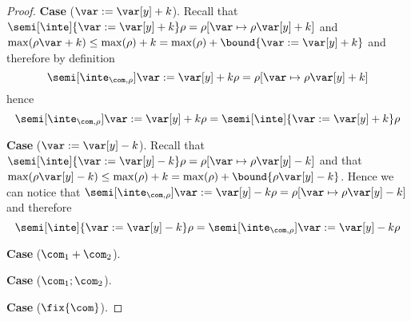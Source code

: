 \begin{proof}
  \medskip

  \noindent
  \textbf{Case} (\(\var := \var[y] + k\)).
  Recall that
  \({\semi[\inte]{\var := \var[y] + k}\rho} = {\rho[\var \mapsto
    \rho\var[y] + k]}\) and
  \({\max(\rho\var + k)} \leq {\max(\rho) + k} = {\max(\rho) +
    \bound{\var := \var[y] + k}}\)
  and therefore by definition
  \begin{equation*}
    \semi[\inte_{\com,\rho}]{\var := \var[y] + k}\rho = \rho[\var \mapsto \rho\var[y] + k]
  \end{equation*}
  hence
  \begin{equation*}
    \semi[\inte_{\com,\rho}]{\var := \var[y] + k}\rho = \semi[\inte]{\var := \var[y] + k}\rho
  \end{equation*}

  \medskip

  \noindent
  \textbf{Case} (\(\var := \var[y] - k\)).
  Recall that
  \({\semi[\inte]{\var := \var[y] - k}\rho} = {\rho[\var \mapsto
    \rho\var[y] - k]}\) and that
  \({\max(\rho\var[y] - k)} \leq {\max(\rho) + k} = {\max(\rho) +
    \bound{\rho\var[y] - k}}\). Hence we can notice that
  \({\semi[\inte_{\com,\rho}]{\var := \var[y] - k}\rho} = {\rho[\var
    \mapsto \rho\var[y] - k]}\) and therefore
  \begin{equation*}
    \semi[\inte]{\var := \var[y] - k}\rho = \semi[\inte_{\com,\rho}]{\var := \var[y] - k}\rho
  \end{equation*}

  \medskip

  \noindent
  \textbf{Case} (\(\com_1 + \com_2\)).
  
  \medskip

  \noindent
  \textbf{Case} (\(\com_1 ; \com_2\)).

  \medskip

  \noindent
  \textbf{Case} (\(\fix{\com}\)).
  

\end{proof}
